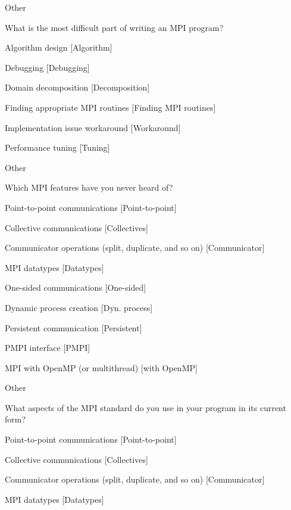 \documentclass[preprint,5p,times]{elsarticle}
\begin{document}
{{\begin{description}
\begin{inparaenum}[{\bf C}1)]
    \item Other
    \end{inparaenum}
  \item[Q15:] What is the most difficult part of writing an MPI program?
    \begin{inparaenum}[{\bf C}1)]
    \item Algorithm design [Algorithm]
    \item Debugging [Debugging]
    \item Domain decomposition [Decomposition]
    \item Finding appropriate MPI routines [Finding MPI routines]
    \item Implementation issue workaround [Workaround]
    \item Performance tuning [Tuning]
    \item Other
    \end{inparaenum}
  \item[Q16*:] Which MPI features have you never heard of?
    \begin{inparaenum}[{\bf C}1)]
    \item Point-to-point communications [Point-to-point]
    \item Collective communications [Collectives]
    \item Communicator operations (split, duplicate, and so on) [Communicator]
    \item MPI datatypes [Datatypes]
    \item One-sided communications [One-sided]
    \item Dynamic process creation [Dyn. process]
    \item Persistent communication [Persistent]
    \item PMPI interface [PMPI]
    \item MPI with OpenMP (or multithread) [with OpenMP]
    \item Other
    \end{inparaenum}
  \item[Q17*:] What aspects of the MPI standard do you use in your program in its current form?
    \begin{inparaenum}[{\bf C}1)]
    \item Point-to-point communications [Point-to-point]
    \item Collective communications [Collectives]
    \item Communicator operations (split, duplicate, and so on) [Communicator]
    \item MPI datatypes [Datatypes]

\end{inparaenum}
\end{description}}}
\end{document}
